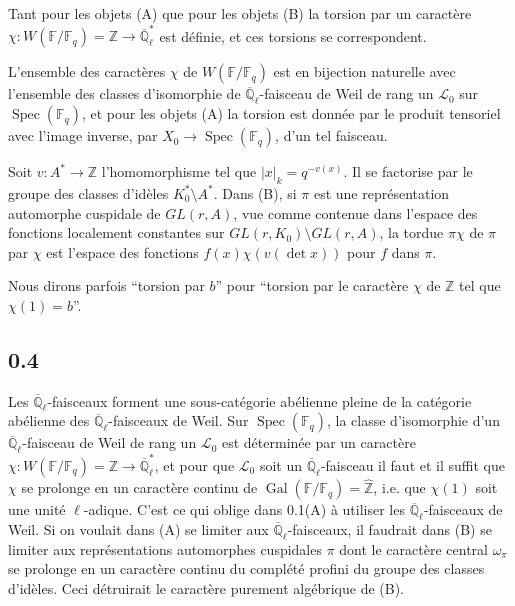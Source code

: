 \documentclass[10pt,a4paper]{article}
\theoremstyle{plain}
\theoremstyle{definition}
\DeclareMathOperator{\Spec}{Spec}
\DeclareMathOperator{\Gal}{Gal}
\begin{document}
Tant pour les objets (A) que pour les objets (B) la torsion par un caract\`ere $\chi: W(\mathbb{F}/\mathbb{F}_q) = \mathbb{Z} \to \overline{\mathbb{Q}}_\ell^*$ est d\'efinie, et ces torsions se correspondent.

L'ensemble des caract\`eres $\chi$ de $W(\mathbb{F}/\mathbb{F}_q)$ est en bijection naturelle avec l'ensemble des classes d'isomorphie de $\overline{\mathbb{Q}}_\ell$-faisceau de Weil de rang un $\mathcal{L}_0$ sur $\Spec(\mathbb{F}_q)$, et pour les objets (A) la torsion est donn\'ee par le produit tensoriel avec l'image inverse, par $X_0 \to \Spec(\mathbb{F}_q)$, d'un tel faisceau.

Soit $v: A^* \to \mathbb{Z}$ l'homomorphisme tel que $|x|_k = q^{-v(x)}$. Il se factorise par le groupe des classes d'id\`eles $K_0^* \setminus A^*$. Dans (B), si $\pi$ est une repr\'esentation automorphe cuspidale de $GL(r,A)$, vue comme contenue dans l'espace des fonctions localement constantes sur $GL(r,K_0) \setminus GL(r,A)$, la tordue $\pi\chi$ de $\pi$ par $\chi$ est l'espace des fonctions $f(x)\chi(v(\det x))$ pour $f$ dans $\pi$.

Nous dirons parfois ``torsion par $b$'' pour ``torsion par le caract\`ere $\chi$ de $\mathbb{Z}$ tel que $\chi(1)=b$''.

\subsection*{0.4}

Les $\overline{\mathbb{Q}}_\ell$-faisceaux forment une sous-cat\'egorie ab\'elienne pleine de la cat\'egorie ab\'elienne des $\overline{\mathbb{Q}}_\ell$-faisceaux de Weil. Sur $\Spec(\mathbb{F}_q)$, la classe d'isomorphie d'un $\overline{\mathbb{Q}}_\ell$-faisceau de Weil de rang un $\mathcal{L}_0$ est d\'etermin\'ee par un caract\`ere $\chi: W(\mathbb{F}/\mathbb{F}_q) = \mathbb{Z} \to \overline{\mathbb{Q}}_\ell^*$, et pour que $\mathcal{L}_0$ soit un $\overline{\mathbb{Q}}_\ell$-faisceau il faut et il suffit que $\chi$ se prolonge en un caract\`ere continu de $\Gal(\mathbb{F}/\mathbb{F}_q) = \hat{\mathbb{Z}}$, i.e. que $\chi(1)$ soit une unit\'e $\ell$-adique. C'est ce qui oblige dans 0.1(A) \`a utiliser les $\overline{\mathbb{Q}}_\ell$-faisceaux de Weil. Si on voulait dans (A) se limiter aux $\overline{\mathbb{Q}}_\ell$-faisceaux, il faudrait dans (B) se limiter aux repr\'esentations automorphes cuspidales $\pi$ dont le caract\`ere central $\omega_\pi$ se prolonge en un caract\`ere continu du compl\'et\'e profini du groupe des classes d'id\`eles. Ceci d\'etruirait le caract\`ere purement alg\'ebrique de (B).
\end{document}
